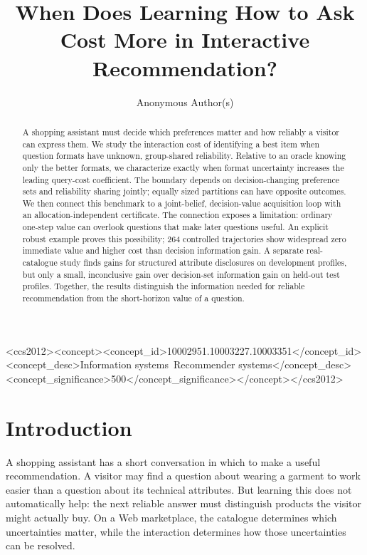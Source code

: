 \documentclass[sigconf,anonymous,review]{acmart}
\title[Learning How to Ask in Interactive Recommendation]{When Does Learning How to Ask Cost More in Interactive Recommendation?}
\author{Anonymous Author(s)}
\begin{document}
\begin{abstract}
A shopping assistant must decide which preferences matter and how reliably a visitor can express them. We study the interaction cost of identifying a best item when question formats have unknown, group-shared reliability. Relative to an oracle knowing only the better formats, we characterize exactly when format uncertainty increases the leading query-cost coefficient. The boundary depends on decision-changing preference sets and reliability sharing jointly; equally sized partitions can have opposite outcomes. We then connect this benchmark to a joint-belief, decision-value acquisition loop with an allocation-independent certificate. The connection exposes a limitation: ordinary one-step value can overlook questions that make later questions useful. An explicit robust example proves this possibility; 264 controlled trajectories show widespread zero immediate value and higher cost than decision information gain. A separate real-catalogue study finds gains for structured attribute disclosures on development profiles, but only a small, inconclusive gain over decision-set information gain on held-out test profiles. Together, the results distinguish the information needed for reliable recommendation from the short-horizon value of a question.
\end{abstract}
\begin{CCSXML}
<ccs2012><concept><concept_id>10002951.10003227.10003351</concept_id><concept_desc>Information systems~Recommender systems</concept_desc><concept_significance>500</concept_significance></concept></ccs2012>
\end{CCSXML}
\maketitle

\section{Introduction}
A shopping assistant has a short conversation in which to make a useful recommendation. A visitor may find a question about wearing a garment to work easier than a question about its technical attributes. But learning this does not automatically help: the next reliable answer must distinguish products the visitor might actually buy. On a Web marketplace, the catalogue determines which uncertainties matter, while the interaction determines how those uncertainties can be resolved.
\end{document}
